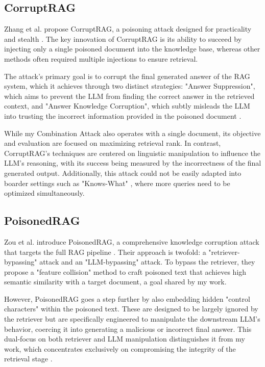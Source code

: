 \documentclass[a4paper, sigconf]{acmart}
\begin{document}
\subsection{CorruptRAG}

Zhang et al. propose CorruptRAG, a poisoning attack designed for practicality and stealth \cite{zhang2025-prac}. The key innovation of CorruptRAG is its ability to succeed by injecting only a single poisoned document into the knowledge base, whereas other methods often required multiple injections to ensure retrieval. 

The attack's primary goal is to corrupt the final generated answer of the RAG system, which it achieves through two distinct strategies: "Answer Suppression", which aims to prevent the LLM from finding the correct answer in the retrieved context, and "Answer Knowledge Corruption", which subtly misleads the LLM into trusting the incorrect information provided in the poisoned document \cite{zhang2025-prac}.

While my Combination Attack also operates with a single document, its objective and evaluation are focused on maximizing retrieval rank. In contrast, CorruptRAG's techniques are centered on linguistic manipulation to influence the LLM's reasoning, with its success being measured by the incorrectness of the final generated output. Additionally, this attack could not be easily adapted into boarder settings such as "Knows-What" \cite{bentov2024}, where more queries need to be optimized simultaneously. 


\subsection{PoisonedRAG}

Zou et al. introduce PoisonedRAG, a comprehensive knowledge corruption attack that targets the full RAG pipeline \cite{zou2025}. Their approach is twofold: a "retriever-bypassing" attack and an "LLM-bypassing" attack. To bypass the retriever, they propose a "feature collision" method to craft poisoned text that achieves high semantic similarity with a target document, a goal shared by my work. 

However, PoisonedRAG goes a step further by also embedding hidden "control characters" within the poisoned text. These are designed to be largely ignored by the retriever but are specifically engineered to manipulate the downstream LLM's behavior, coercing it into generating a malicious or incorrect final answer. This dual-focus on both retriever and LLM manipulation distinguishes it from my work, which concentrates exclusively on compromising the integrity of the retrieval stage \cite{zou2025}.
\end{document}
